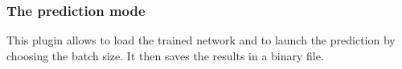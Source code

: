 \documentclass{article}
\begin{document}







\subsubsection{The prediction mode}

This plugin allows to load the trained network and to launch the prediction by choosing the batch size. It then saves the results in a binary file.




\end{document}

